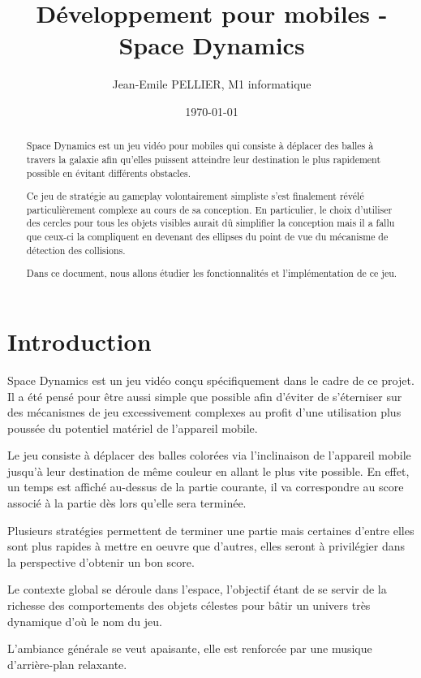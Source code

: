 \documentclass{article}
\title{Développement pour mobiles - Space Dynamics}
\author{Jean-Emile PELLIER, M1 informatique}
\date{\today}
\begin{document}
\maketitle %


\begin{abstract}
  Space Dynamics est un jeu vidéo pour mobiles qui consiste à déplacer des balles à travers la galaxie afin qu’elles puissent atteindre leur destination le plus rapidement possible en évitant différents obstacles.
  
  Ce jeu de stratégie au gameplay volontairement simpliste s’est finalement révélé particulièrement complexe au cours de sa conception. En particulier, le choix d’utiliser des cercles pour tous les objets visibles aurait dû simplifier la conception mais il a fallu que ceux-ci la compliquent en devenant des ellipses du point de vue du mécanisme de détection des collisions.

  Dans ce document, nous allons étudier les fonctionnalités et l’implémentation de ce jeu.

\end{abstract}



\section*{Introduction}
Space Dynamics est un jeu vidéo conçu spécifiquement dans le cadre de ce projet. Il a été pensé pour être aussi simple que possible afin d’éviter de s’éterniser sur des mécanismes de jeu excessivement complexes au profit d’une utilisation plus poussée du potentiel matériel de l’appareil mobile.

Le jeu consiste à déplacer des balles colorées via l’inclinaison de l’appareil mobile jusqu’à leur destination de même couleur en allant le plus vite possible. En effet, un temps est affiché au-dessus de la partie courante, il va correspondre au score associé à la partie dès lors qu’elle sera terminée.

Plusieurs stratégies permettent de terminer une partie mais certaines d'entre elles sont plus rapides à mettre en oeuvre que d'autres, elles seront à privilégier dans la perspective d'obtenir un bon score. 

Le contexte global se déroule dans l’espace, l’objectif étant de se servir de la richesse des comportements des objets célestes pour bâtir un univers très dynamique d’où le nom du jeu.

L’ambiance générale se veut apaisante, elle est renforcée par une musique d’arrière-plan relaxante.
\end{document}
